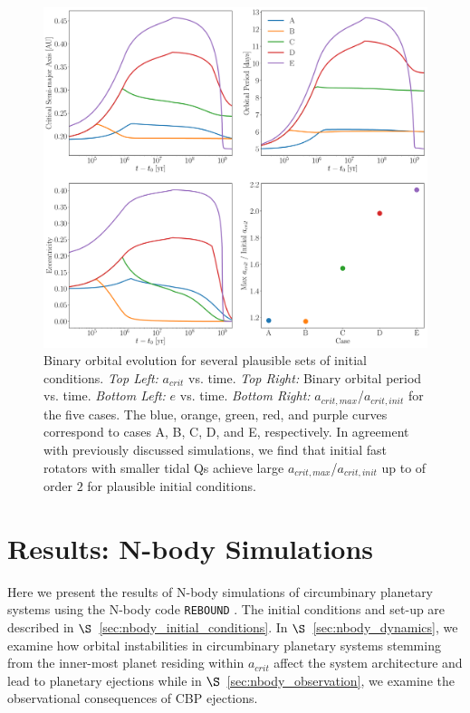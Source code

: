 \begin{figure}
	\includegraphics[width=\columnwidth]{opt.pdf}
   \caption{Binary orbital evolution for several plausible sets of initial conditions. {\it Top Left:} $a_{crit}$ vs. time.  {\it Top Right:} Binary orbital period vs. time. {\it Bottom Left:} $e$ vs. time. {\it Bottom Right:} $a_{crit,max}$/$a_{crit,init}$ for the five cases.  The blue, orange, green, red, and purple curves correspond to cases A, B, C, D, and E, respectively.  In agreement with previously discussed simulations, we find that initial fast rotators with smaller tidal Qs achieve large $a_{crit,max}$/$a_{crit,init}$ up to of order $2$ for plausible initial conditions.}
    \label{fig:opt}
\end{figure}

\section{Results: N-body Simulations} \label{sec:nbody_results}

Here we present the results of N-body simulations of circumbinary planetary systems using the N-body code \texttt{REBOUND} \citep{Rein2012,Rein2015}.  The initial conditions and set-up are described in $\S$~\ref{sec:nbody_initial_conditions}.  In $\S$~\ref{sec:nbody_dynamics}, we examine how orbital instabilities in circumbinary planetary systems stemming from the inner-most planet residing within $a_{crit}$ affect the system architecture and lead to planetary ejections while in $\S$~\ref{sec:nbody_observation}, we examine the observational consequences of CBP ejections.

